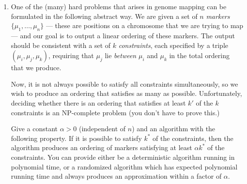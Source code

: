 \documentclass[12pt]{article}
\begin{document}
\begin{enumerate}
{}


\item

One of the (many) hard problems that arises in
genome mapping can be formulated in the following abstract way.
We are given a set of $n$ {\em markers}
$\{\mu_1, \ldots, \mu_n\}$ --- these are positions
on a chromosome that we are trying to map ---
and our goal is to output a linear ordering of these markers.
The output should be consistent with a set of $k$ {\em constraints},
each specified by a triple $(\mu_i, \mu_j, \mu_k)$,
requiring that $\mu_j$ lie {\em between} $\mu_i$ and
$\mu_k$ in the total ordering that we produce.

Now, it is not always possible to satisfy all constraints
simultaneously, so we wish to produce an ordering that
satisfies as many as possible.
Unfortunately, deciding whether there is an ordering
that satisfies at least $k'$ of the $k$ constraints
is an NP-complete problem (you don't have to prove this.)

Give a constant $\alpha > 0$ (independent of $n$) and
an algorithm with the following property.
If it is possible to satisfy $k^*$ of the constraints,
then the algorithm produces an ordering of markers satisfying
at least $\alpha k^*$ of the constraints.
You can provide either be a deterministic
algorithm running in polynomial time,
or a randomized algorithm which has
expected polynomial running time and
always produces an approximation within a factor of $\alpha$.

\end{enumerate}
\end{document}
